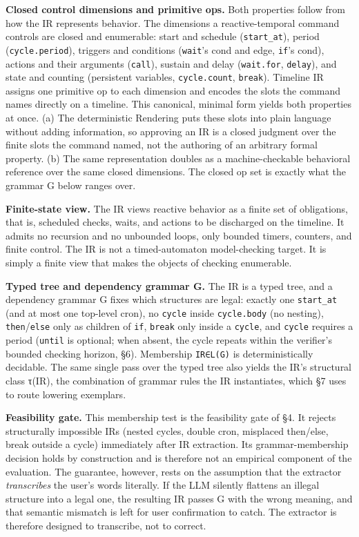 \documentclass[sigconf,nonacm,anonymous,review]{acmart}
\begin{document}
\textbf{Closed control dimensions and primitive ops.} Both properties follow from how the IR represents behavior. The dimensions a reactive-temporal command controls are closed and enumerable: start and schedule (\texttt{start\_at}), period (\texttt{cycle.period}), triggers and conditions (\texttt{wait}'s cond and edge, \texttt{if}'s cond), actions and their arguments (\texttt{call}), sustain and delay (\texttt{wait.for}, \texttt{delay}), and state and counting (persistent variables, \texttt{cycle.count}, \texttt{break}). Timeline IR assigns one primitive op to each dimension and encodes the slots the command names directly on a timeline. This canonical, minimal form yields both properties at once. (a) The deterministic Rendering puts these slots into plain language without adding information, so approving an IR is a closed judgment over the finite slots the command named, not the authoring of an arbitrary formal property. (b) The same representation doubles as a machine-checkable behavioral reference over the same closed dimensions. The closed op set is exactly what the grammar G below ranges over.

\textbf{Finite-state view.} The IR views reactive behavior as a finite set of obligations, that is, scheduled checks, waits, and actions to be discharged on the timeline. It admits no recursion and no unbounded loops, only bounded timers, counters, and finite control. The IR is not a timed-automaton model-checking target. It is simply a finite view that makes the objects of checking enumerable.

\textbf{Typed tree and dependency grammar G.} The IR is a typed tree, and a dependency grammar G fixes which structures are legal: exactly one \texttt{start\_at} (and at most one top-level cron), no \texttt{cycle} inside \texttt{cycle.body} (no nesting), \texttt{then}/\texttt{else} only as children of \texttt{if}, \texttt{break} only inside a \texttt{cycle}, and \texttt{cycle} requires a period (\texttt{until} is optional; when absent, the cycle repeats within the verifier's bounded checking horizon, \S6). Membership \texttt{IR∈L(G)} is deterministically decidable. The same single pass over the typed tree also yields the IR's structural class τ(IR), the combination of grammar rules the IR instantiates, which \S7 uses to route lowering exemplars.

\textbf{Feasibility gate.} This membership test is the feasibility gate of \S4. It rejects structurally impossible IRs (nested cycles, double cron, misplaced then/else, break outside a cycle) immediately after IR extraction. Its grammar-membership decision holds by construction and is therefore not an empirical component of the evaluation. The guarantee, however, rests on the assumption that the extractor \emph{transcribes} the user's words literally. If the LLM silently flattens an illegal structure into a legal one, the resulting IR passes G with the wrong meaning, and that semantic mismatch is left for user confirmation to catch. The extractor is therefore designed to transcribe, not to correct.
\end{document}
